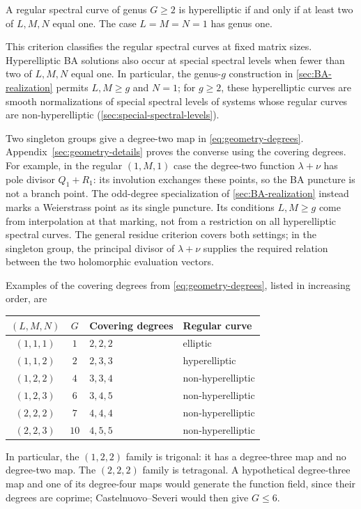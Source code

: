 \begin{proposition}\label{prop:geometry-hyperelliptic}
A regular spectral curve of genus $G\geq2$ is hyperelliptic if and
only if at least two of $L,M,N$ equal one. The case $L=M=N=1$
has genus one.
\end{proposition}
This criterion classifies the regular spectral curves at fixed matrix
sizes. Hyperelliptic BA solutions also occur at special spectral levels
when fewer than two of $L,M,N$ equal one. In particular, the
genus-$g$ construction in \cref{sec:BA-realization} permits
$L,M\geq g$ and $N=1$; for $g\geq2$, these hyperelliptic curves
are smooth normalizations of special spectral levels of systems whose
regular curves are non-hyperelliptic
(\cref{sec:special-spectral-levels}).

Two singleton groups give a degree-two map in
\cref{eq:geometry-degrees}. Appendix~\ref{sec:geometry-details}
proves the converse using the covering degrees.
For example, in the regular $(1,M,1)$ case the degree-two function
$\lambda+\nu$ has pole divisor $Q_1+R_1$: its involution exchanges
these points, so the BA puncture is not a branch point. The
odd-degree specialization of \cref{sec:BA-realization} instead marks
a Weierstrass point as its single puncture. Its conditions $L,M\geq g$
come from interpolation at that marking, not from a restriction on
all hyperelliptic spectral curves. The general residue criterion
covers both settings; in the singleton group, the principal divisor
of $\lambda+\nu$ supplies the required relation between the two
holomorphic evaluation vectors.



\noindent\begin{minipage}{\textwidth}
Examples of the covering degrees from \cref{eq:geometry-degrees},
listed in increasing order, are
\begin{center}
\begin{tabular}{ccll}
 $(L,M,N)$ & $G$ & Covering degrees & Regular curve\\\hline
 $(1,1,1)$ & $1$ & $2,2,2$ & elliptic\\
 $(1,1,2)$ & $2$ & $2,3,3$ & hyperelliptic\\
 $(1,2,2)$ & $4$ & $3,3,4$ & non-hyperelliptic\\
 $(1,2,3)$ & $6$ & $3,4,5$ & non-hyperelliptic\\
 $(2,2,2)$ & $7$ & $4,4,4$ & non-hyperelliptic\\
 $(2,2,3)$ & $10$ & $4,5,5$ & non-hyperelliptic
\end{tabular}
\end{center}
\end{minipage}\par\medskip
In particular, the $(1,2,2)$ family is trigonal: it has a
degree-three map and no degree-two map. The $(2,2,2)$ family is
tetragonal. A hypothetical degree-three map and one of its
degree-four maps would generate the function field, since their
degrees are coprime; Castelnuovo--Severi would then give $G\leq6$.

